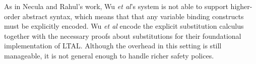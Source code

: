 \documentclass{llncs}
\begin{document}
As in Necula and Rahul's work, Wu {\em et al}'s system is not able to
support higher-order abstract syntax, which means that that any
variable binding constructs must be explicitly encoded. Wu {\em et
al}\cite{Appel:PPDP03} encode the explicit substitution calculus
\cite{Abadi:POPL90} together with the necessary proofs about
substitutions for their foundational implementation of LTAL. Although
the overhead in this setting is still manageable, it is not general
enough to handle richer safety polices.







\end{document}
